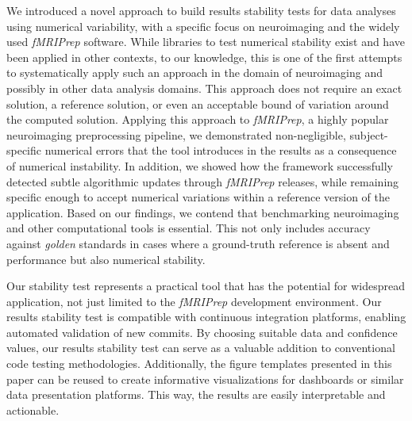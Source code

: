 \documentclass[lettersize,journal]{IEEEtran}
\newcommand{\fmriprep}{\emph{fMRIPrep}\xspace}
\begin{document}

We introduced a novel approach to build results stability tests for data
analyses using numerical variability, with a specific focus on neuroimaging and
the widely used \fmriprep software. While libraries to test numerical stability
exist and have been applied in other contexts, to our knowledge, this is one of
the first attempts to systematically apply such an approach in the domain of
neuroimaging and possibly in other data analysis domains. This approach does
not require an exact solution, a reference solution, or even an acceptable
bound of variation around the computed solution. Applying this approach to
\fmriprep, a highly popular neuroimaging preprocessing pipeline, we
demonstrated non-negligible, subject-specific numerical errors that the tool
introduces in the results as a consequence of numerical instability. In
addition, we showed how the framework successfully detected subtle algorithmic
updates through \fmriprep releases, while remaining specific enough to accept
numerical variations within a reference version of the application. Based on
our findings, we contend that benchmarking neuroimaging and other computational
tools is essential. This not only includes accuracy against \emph{golden}
standards in cases where a ground-truth reference is absent and performance but
also numerical stability.

Our stability test represents a practical tool that has the potential for
widespread application, not just limited to the \fmriprep development
environment. Our results stability test is compatible with continuous
integration platforms, enabling automated validation of new commits. By
choosing suitable data and confidence values, our results stability test can
serve as a valuable addition to conventional code testing methodologies.
Additionally, the figure templates presented in this paper can be reused to
create informative visualizations for dashboards or similar data presentation
platforms. This way, the results are easily interpretable and actionable.
\end{document}
